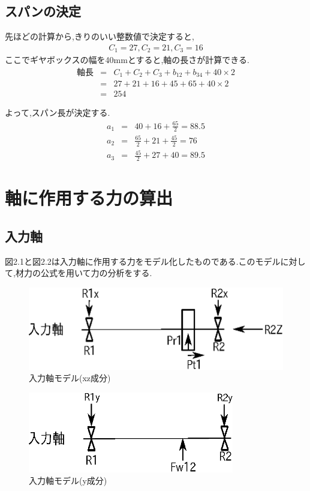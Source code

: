 \subsection{スパンの決定}
先ほどの計算から,きりのいい整数値で決定すると,
\begin{eqnarray}
C_1=27,C_2=21,C_3=16\nonumber
\end{eqnarray}
ここでギヤボックスの幅を40mmとすると,軸の長さが計算できる.
\begin{eqnarray}
軸長&=&C_1+C_2+C_3+b_{12}+b_{34}+40 \times 2\\
    &=&27+21+16+45+65+40 \times 2\\
    &=&254
\end{eqnarray}

よって,スパン長が決定する.
\begin{eqnarray}
a_1&=&40 + 16 + \frac{65}{2} = 88.5\\
a_2&=&\frac{65}{2} + 21 + \frac{45}{2} = 76\\
a_3&=&\frac{45}{2} + 27 + 40 = 89.5
\end{eqnarray}

\section{軸に作用する力の算出}
\subsection{入力軸}
図2.1と図2.2は入力軸に作用する力をモデル化したものである.このモデルに対して,材力の公式を用いて力の分析をする.
\begin{figure}[htbp]
\begin{center}
\includegraphics[width=12cm]{../picture/jiku1.eps}
\end{center}
\caption{入力軸モデル(xz成分)}
\end{figure}
\begin{figure}[htbp]
\begin{center}
\includegraphics[width=9cm]{../picture/jiku12.eps}
\end{center}
\caption{入力軸モデル(y成分)}
\end{figure}
